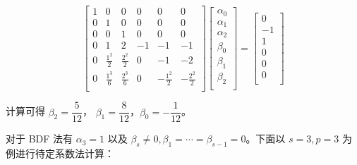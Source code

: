 \documentclass[a4paper]{article}
\begin{document}
\begin{equation}
    \begin{bmatrix}
        1 & 0 & 0 & 0 & 0 & 0 \\
        0 & 1 & 0 & 0 & 0 & 0 \\
        0 & 0 & 1 & 0 & 0 & 0 \\
        0 & 1 & 2 & -1 & -1 & -1 \\
        0 & \frac{1^2}{2} & \frac{2^2}{2}& 0 & -1 & -2\\
        0 & \frac{1^3}{6} & \frac{2^3}{6}& 0 & -\frac{1^2}{2} & -\frac{2^2}{2}\\
    \end{bmatrix}
    \begin{bmatrix}
        \alpha_0\\
        \alpha_1\\
        \alpha_2\\
        \beta_0\\
        \beta_1\\
        \beta_2\\
    \end{bmatrix}
    =
    \begin{bmatrix}
        0\\
        -1\\
        1\\
        0\\
        0\\
        0\\
    \end{bmatrix}
\end{equation}
\par 计算可得 $\beta_2=\dfrac{5}{12}$，
$\beta_1=\dfrac{8}{12}$，$\beta_0=-\dfrac{1}{12}$。
\par 对于 BDF 法有 $\alpha_3=1$ 以及 $\beta_s\neq 0, 
\beta_1=\cdots=\beta_{s-1}=0$。下面以 $s=3, p=3$ 为例进行待定系数法计算：
\end{document}

